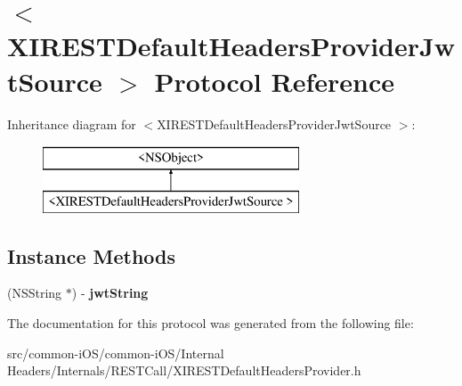 \hypertarget{protocol_x_i_r_e_s_t_default_headers_provider_jwt_source_01-p}{}\section{$<$X\+I\+R\+E\+S\+T\+Default\+Headers\+Provider\+Jwt\+Source $>$ Protocol Reference}
\label{protocol_x_i_r_e_s_t_default_headers_provider_jwt_source_01-p}
Inheritance diagram for $<$X\+I\+R\+E\+S\+T\+Default\+Headers\+Provider\+Jwt\+Source $>$\+:\begin{figure}[H]
\begin{center}
\leavevmode
\includegraphics[height=2.000000cm]{protocol_x_i_r_e_s_t_default_headers_provider_jwt_source_01-p}
\end{center}
\end{figure}
\subsection*{Instance Methods}
\begin{DoxyCompactItemize}
\item 
\hypertarget{protocol_x_i_r_e_s_t_default_headers_provider_jwt_source_01-p_afe70c3ab755bcac12b13e07d87e5528c}{}\label{protocol_x_i_r_e_s_t_default_headers_provider_jwt_source_01-p_afe70c3ab755bcac12b13e07d87e5528c} 
(N\+S\+String $\ast$) -\/ {\bfseries jwt\+String}
\end{DoxyCompactItemize}


The documentation for this protocol was generated from the following file\+:\begin{DoxyCompactItemize}
\item 
src/common-\/i\+O\+S/common-\/i\+O\+S/\+Internal Headers/\+Internals/\+R\+E\+S\+T\+Call/X\+I\+R\+E\+S\+T\+Default\+Headers\+Provider.\+h\end{DoxyCompactItemize}
